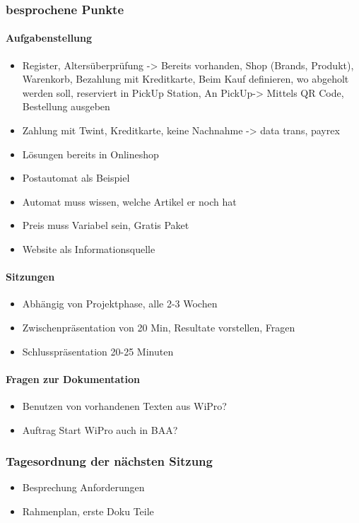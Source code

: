 \subsubsection{besprochene Punkte}
\paragraph{Aufgabenstellung}
	\begin{itemize}
		\item Register, Altersüberprüfung -> Bereits vorhanden, Shop (Brands, Produkt), Warenkorb, Bezahlung mit Kreditkarte, Beim Kauf definieren, wo abgeholt werden soll, reserviert in PickUp Station, An PickUp-> Mittels QR Code, Bestellung ausgeben
		\item Zahlung mit Twint, Kreditkarte, keine Nachnahme -> data trans, payrex
		\item Lösungen bereits in Onlineshop 
		\item Postautomat als Beispiel
		\item Automat muss wissen, welche Artikel er noch hat
		\item Preis muss Variabel sein, Gratis Paket
		\item Website als Informationsquelle
	 	\end{itemize}
\paragraph{Sitzungen}
	\begin{itemize}
		\item Abhängig von Projektphase, alle 2-3 Wochen
		\item Zwischenpräsentation von 20 Min, Resultate vorstellen, Fragen
		\item Schlusspräsentation 20-25 Minuten
	\end{itemize}
	
\paragraph{Fragen zur Dokumentation}
\begin{itemize}
	\item Benutzen von vorhandenen Texten aus WiPro?
	\item Auftrag Start WiPro auch in BAA?
\end{itemize}
\subsubsection{Tagesordnung der nächsten Sitzung}
\begin{itemize}
	\item Besprechung Anforderungen 
	\item Rahmenplan, erste Doku Teile
\end{itemize}


